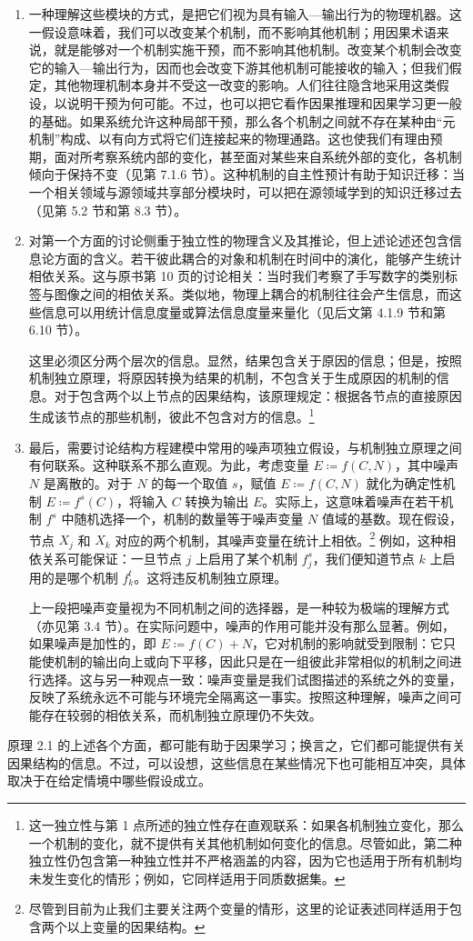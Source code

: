 \begin{enumerate}
\item 一种理解这些模块的方式，是把它们视为具有输入—输出行为的物理机器。这一假设意味着，我们可以改变某个机制，而不影响其他机制；用因果术语来说，就是能够对一个机制实施干预，而不影响其他机制。改变某个机制会改变它的输入—输出行为，因而也会改变下游其他机制可能接收的输入；但我们假定，其他物理机制本身并不受这一改变的影响。人们往往隐含地采用这类假设，以说明干预为何可能。不过，也可以把它看作因果推理和因果学习更一般的基础。如果系统允许这种局部干预，那么各个机制之间就不存在某种由“元机制”构成、以有向方式将它们连接起来的物理通路。这也使我们有理由预期，面对所考察系统内部的变化，甚至面对某些来自系统外部的变化，各机制倾向于保持不变（见第 7.1.6 节）。这种机制的自主性预计有助于知识迁移：当一个相关领域与源领域共享部分模块时，可以把在源领域学到的知识迁移过去（见第 5.2 节和第 8.3 节）。

\item 对第一个方面的讨论侧重于独立性的物理含义及其推论，但上述论述还包含信息论方面的含义。若干彼此耦合的对象和机制在时间中的演化，能够产生统计相依关系。这与原书第 10 页的讨论相关：当时我们考察了手写数字的类别标签与图像之间的相依关系。类似地，物理上耦合的机制往往会产生信息，而这些信息可以用统计信息度量或算法信息度量来量化（见后文第 4.1.9 节和第 6.10 节）。

这里必须区分两个层次的信息。显然，结果包含关于原因的信息；但是，按照机制独立原理，将原因转换为结果的机制，不包含关于生成原因的机制的信息。对于包含两个以上节点的因果结构，该原理规定：根据各节点的直接原因生成该节点的那些机制，彼此不包含对方的信息。\footnote{这一独立性与第 1 点所述的独立性存在直观联系：如果各机制独立变化，那么一个机制的变化，就不提供有关其他机制如何变化的信息。尽管如此，第二种独立性仍包含第一种独立性并不严格涵盖的内容，因为它也适用于所有机制均未发生变化的情形；例如，它同样适用于同质数据集。}

\item 最后，需要讨论结构方程建模中常用的噪声项独立假设，与机制独立原理之间有何联系。这种联系不那么直观。为此，考虑变量 $E\coloneqq f(C,N)$，其中噪声 $N$ 是离散的。对于 $N$ 的每一个取值 $s$，赋值 $E\coloneqq f(C,N)$ 就化为确定性机制 $E\coloneqq f^s(C)$，将输入 $C$ 转换为输出 $E$。实际上，这意味着噪声在若干机制 $f^s$ 中随机选择一个，机制的数量等于噪声变量 $N$ 值域的基数。现在假设，节点 $X_j$ 和 $X_k$ 对应的两个机制，其噪声变量在统计上相依。\footnote{尽管到目前为止我们主要关注两个变量的情形，这里的论证表述同样适用于包含两个以上变量的因果结构。}
例如，这种相依关系可能保证：一旦节点 $j$ 上启用了某个机制 $f_j^s$，我们便知道节点 $k$ 上启用的是哪个机制 $f_k^t$。这将违反机制独立原理。

上一段把噪声变量视为不同机制之间的选择器，是一种较为极端的理解方式（亦见第 3.4 节）。在实际问题中，噪声的作用可能并没有那么显著。例如，如果噪声是加性的，即 $E\coloneqq f(C)+N$，它对机制的影响就受到限制：它只能使机制的输出向上或向下平移，因此只是在一组彼此非常相似的机制之间进行选择。这与另一种观点一致：噪声变量是我们试图描述的系统之外的变量，反映了系统永远不可能与环境完全隔离这一事实。按照这种理解，噪声之间可能存在较弱的相依关系，而机制独立原理仍不失效。
\end{enumerate}

原理 2.1 的上述各个方面，都可能有助于因果学习；换言之，它们都可能提供有关因果结构的信息。不过，可以设想，这些信息在某些情况下也可能相互冲突，具体取决于在给定情境中哪些假设成立。
\FloatBarrier
